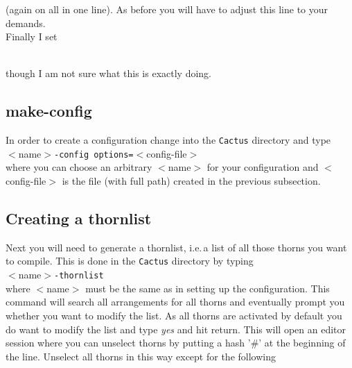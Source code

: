\documentclass[11pt]{article}
\numberwithin{equation}{section}
\begin{document}
(again on all in one line). As before you will have to adjust this line to
your demands.\\
Finally I set


\\

though I am not sure what this is exactly doing.



\subsection{make-config}

In order to create a configuration change into the {\tt Cactus}
directory and type\\

\hspace{1cm}{\tt make} $<$name$>${\tt-config options=}$<$config-file$>$\\

where you can choose an arbitrary $<$name$>$ for your configuration and
$<$config-file$>$ is the file (with full path) created in the previous
subsection.

\subsection{Creating a thornlist}

Next you will need to generate a thornlist, i.e.\,a list of all those
thorns you want to compile. This is done in the {\tt Cactus} directory
by typing\\

\hspace{1cm}{\tt make} $<$name$>${\tt-thornlist}\\

where $<$name$>$ must be the same as in setting up the configuration.
This command
will search all arrangements for all thorns and eventually prompt you
whether you want to modify the list. As all thorns are activated by default
you do want to modify the list and type {\em yes} and hit return. This
will open an editor session where you can unselect thorns by putting a
hash '\#' at the beginning of the line. Unselect all thorns in this
way except for the following\\
\end{document}
